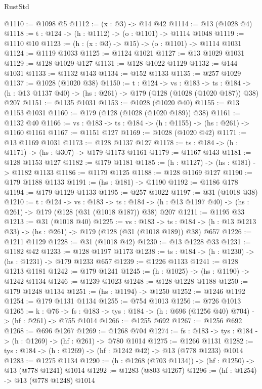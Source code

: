 \begin{lexlean}{RustStd}
\begin{coremodule}
@1110 := @1098 @5
@1112 := (x : @3) -> @14 @42
@1114 := @13 (@1028 @4)
@1118 := {t : @124} -> (h : @1112) -> (o : @1101) -> @1114 @1048
@1119 := @1110 @10
@1123 := (h : (x : @3) -> @15) -> (o : @1101) -> @1114 @1031
@1124 := @1119 @1033
@1125 := @1124 @1021
@1127 := @13 @1029 @1031
@1129 := @128 @1029 @127
@1131 := @128 @1022 @1129
@1132 := @144 @1031
@1133 := @1132 @143
@1134 := @152 @1133
@1135 := @257 @1029
@1137 := @1028 (@1020 @38)
@1150 := {t : @124} ->
  {vs : @183} ->
  {ts : @184} -> (h : @13 @1137 @40) -> (hs : @261) -> @179 (@128 (@1028 (@1020 @187)) @38) @207
@1151 := @1135 @1031
@1153 := @1028 (@1020 @40)
@1155 := @13 @1153 @1031
@1160 := @179 (@128 (@1028 (@1020 @189)) @38)
@1161 := @1132 @40
@1166 := {vs : @183} -> {ts : @184} -> (h : @1155) -> (hs : @261) -> @1160 @1161
@1167 := @1151 @127
@1169 := @1028 (@1020 @42)
@1171 := @13 @1169 @1031
@1173 := @128 @1137 @127
@1178 := {ts : @184} -> (h : @1171) -> (hs : @307) -> @179 @1173 @1161
@1179 := @1167 @143
@1181 := @128 @1153 @127
@1182 := @179 @1181
@1185 := (h : @1127) -> (hs : @181) -> @1182 @1133
@1186 := @1179 @1125
@1188 := @128 @1169 @127
@1190 := @179 @1188 @1133
@1191 := (hs : @181) -> @1190
@1192 := @1186 @178
@1194 := @179 @1129 @1133
@1195 := @257 @1022
@1197 := @31 (@1018 @38)
@1210 := {t : @124} ->
  {vs : @183} ->
  {ts : @184} -> (h : @13 @1197 @40) -> (hs : @261) -> @179 (@128 (@31 (@1018 @187)) @38) @207
@1211 := @1195 @33
@1213 := @31 (@1018 @40)
@1225 := {vs : @183} ->
  {ts : @184} -> (h : @13 @1213 @33) -> (hs : @261) -> @179 (@128 (@31 (@1018 @189)) @38) @657
@1226 := @1211 @1129
@1228 := @31 (@1018 @42)
@1230 := @13 @1228 @33
@1231 := @1182 @42
@1233 := @128 @1197 @1173
@1238 := {ts : @184} -> (h : @1230) -> (hs : @1231) -> @179 @1233 @657
@1239 := @1226 @1133
@1241 := @128 @1213 @1181
@1242 := @179 @1241
@1245 := (h : @1025) -> (hs : @1190) -> @1242 @1134
@1246 := @1239 @1023
@1248 := @128 @1228 @1188
@1250 := @179 @1248 @1134
@1251 := (hs : @1194) -> @1250
@1252 := @1246 @1192
@1254 := @179 @1131 @1134
@1255 := @754 @1013
@1256 := @726 @1013
@1265 := {k : @76} ->
  {fs : @183} -> {tys : @184} -> (h : @696 (@1256 @40) @704) -> (hf : @261) -> @755 @1014
@1266 := @1255 @692
@1267 := @1256 @692
@1268 := @696 @1267
@1269 := @1268 @704
@1274 := {fs : @183} -> {tys : @184} -> (h : @1269) -> (hf : @261) -> @780 @1014
@1275 := @1266 @1131
@1282 := {tys : @184} -> (h : @1269) -> (hf : @1242 @42) -> @13 (@778 @1233) @1014
@1283 := @1275 @1134
@1290 := (h : @1268 (@703 @1134)) -> (hf : @1250) -> @13 (@778 @1241) @1014
@1292 := @1283 (@803 @1267)
@1296 := (hf : @1254) -> @13 (@778 @1248) @1014

\end{coremodule}
\end{lexlean}
